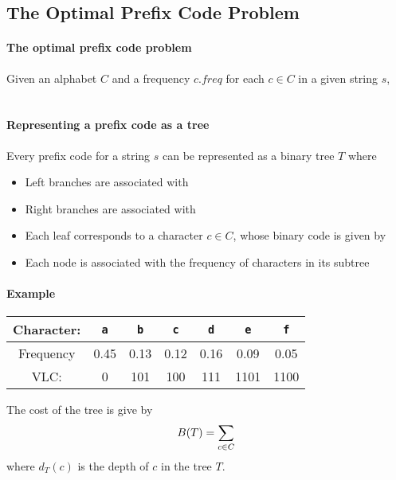 \documentclass[11  pt]{article}
\newcommand{\tta}{\tt{a}}
\newcommand{\ttb}{\tt{b}}
\newcommand{\ttc}{\tt{c}}
\newcommand{\tte}{\tt{e}}
\newcommand{\ttd}{\tt{d}}
\newcommand{\ttf}{\tt{f}}
\begin{document}
\subsection{The Optimal Prefix Code Problem}

\paragraph{The optimal prefix code problem} Given an alphabet $C$ and a frequency $\mathit{c.freq}$ for each $c \in C$ in a given string $s$,  \\ \\ %


\paragraph{Representing a prefix code as a tree}
Every prefix code for a string $s$ can be represented as a binary tree $T$ where 
\begin{itemize}
\item Left branches are associated with %
\item Right branches are associated with %
\item Each leaf corresponds to a character $c \in C$, whose binary code is given by \\
\item Each node is associated with the frequency of characters in its subtree
\end{itemize}

\paragraph{Example}
\begin{tabular}{c c c c c c c}
Character: &  \tta & \ttb & \ttc & \ttd & \tte & \ttf \\
\hline
Frequency & 0.45 & 0.13 & 0.12 & 0.16 & 0.09 & 0.05 \\
VLC: &0 & 101 & 100 & 111 & 1101 & 1100 \\
\hline
\end{tabular} 

\newpage

The cost of the tree is give by \\
\begin{equation*}
B(T) = \sum_{c \in C} \\%
\end{equation*}
where $d_T(c)$ is the depth of $c$ in the tree $T$. 
\end{document}
